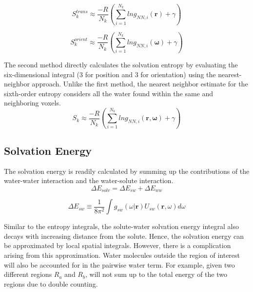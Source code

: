 \documentclass[9pt,tutorial]{livecoms}
\begin{document}
\begin{equation}
	S_{k}^\textit{trans} \approx \frac{-R}{N_\textit{k}} \left( \sum _{i=1}^{N_k} ln g_{NN, \textit{i}} \left( \textbf{r} \right) + \gamma \right)
\end{equation}


\begin{equation}
	S_{k}^\textit{orient} \approx \frac{-R}{N_\textit{k}} \left( \sum _{i=1}^{N_k} ln g_{NN, \textit{i}} \left( \mathbf {\omega} \right) + \gamma \right)
\end{equation}

The second method directly calculates the solvation entropy by evaluating the six-dimensional integral (3 for position and 3 for orientation) 
using the nearest-neighbor approach. Unlike the first method, the nearest neighbor estimate for the sixth-order entropy considers all the water 
found within the same and neighboring voxels.  
\begin{equation}
	S_\textit{k} \approx \frac{-R}{N_\textit{k}} \left( \sum _{i=1}^{N_k} ln g_{NN, \textit{i}} \left( \textbf{r}, \mathbf {\omega} \right) + \gamma \right)
\end{equation}


\subsection{Solvation Energy}
The solvation energy is readily calculated by summing up the contributions of the water-water interaction and the water-solute interaction.
\begin{equation}
	\Delta E_\textit{solv} = \Delta E_\textit{sw} + \Delta E_\textit{ww}
\end{equation}

\begin{equation}
	\Delta E_\textit{sw} \equiv \frac{1}{8\pi^2} \int g_\textit{sw}\left(\omega|\textbf{r}\right) U_\textit{sw}\left(\textbf{r}, \omega\right) d\omega
\end{equation}

Similar to the entropy integrals, the solute-water solvation energy integral also decays with increasing distance from the solute. Hence, the solvation energy can be approximated by local spatial integrals. However, there is a complication arising from this approximation. Water molecules outside the region of interest will also be accounted for in the pairwise water term. For example, given two different regions $R_a$ and $R_b$, will not sum up to the total energy of the two regions due to double counting. 
\end{document}
